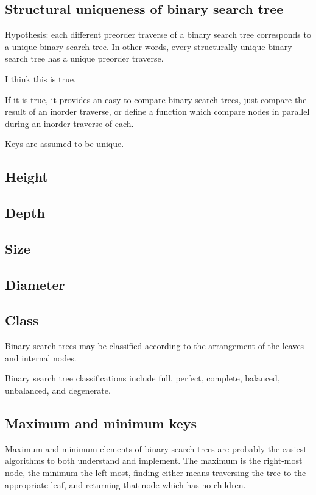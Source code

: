 \documentclass{article}
\begin{document}
\subsection{Structural uniqueness of binary search tree}

Hypothesis: each different preorder traverse of a binary search
tree corresponds to a unique binary search tree. In other words,
every structurally unique binary search
tree has a unique preorder traverse.

I think this is true.

If it is true, it provides an easy to compare binary
search trees, just compare the result of an inorder
traverse, or define a function which compare nodes in
parallel during an inorder traverse of each.

Keys are assumed to be unique.

\subsection{Height}

\subsection{Depth}

\subsection{Size}

\subsection{Diameter}

\subsection{Class}

Binary search trees may be classified according to the
arrangement of the leaves and internal nodes.

Binary search tree classifications include
full, perfect, complete, balanced, unbalanced, and degenerate.

\subsection{Maximum and minimum keys}

\setcounter{sno}{0}

\sno Maximum and minimum elements of binary search trees are probably the easiest
algorithms to both understand and implement. \sno The maximum is the right-most
node, the minimum the left-most, finding either means traversing the tree
to the appropriate leaf, and returning that node which has no children.
\end{document}
